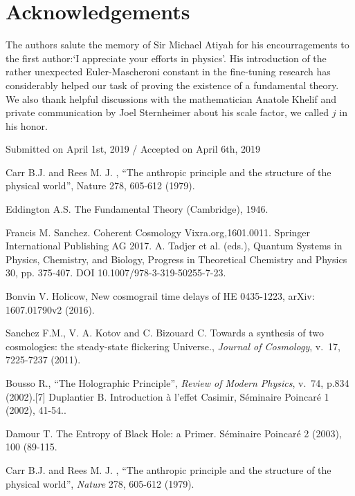 \documentclass[twoside,draft]{article}
\begin{document}
\begin{sloppypar}
{\section*{Acknowledgements}
The authors salute the memory of Sir Michael Atiyah for his encourragements to the
first author:`I appreciate your efforts in physics'. His introduction of the rather
unexpected Euler-Mascheroni constant in the fine-tuning research has considerably helped our task
of proving the existence of a fundamental theory. We also thank helpful discussions with the 
mathematician Anatole Khelif and private communication by Joel Sternheimer about his scale factor, 
we called $j$ in his honor.
%
\begin{flushright}\footnotesize
Submitted on April 1st, 2019 / Accepted on April 6th, 2019
\end{flushright}


\begin{thebibliography}{99}\footnotesize



 Carr B.J. and Rees M. J. , “The anthropic principle and the structure of the physical world”,
Nature 278, 605-612 (1979). %

 Eddington A.S. The Fundamental Theory (Cambridge), 1946.

 Francis M. Sanchez. Coherent Cosmology Vixra.org,1601.0011. Springer International Publishing AG
2017. A. Tadjer et al. (eds.), Quantum Systems in Physics, Chemistry, and Biology, Progress in
Theoretical Chemistry and Physics 30, pp. 375-407. DOI 10.1007/978-3-319-50255-7-23. %

 Bonvin V. Holicow, New cosmograil time delays of HE 0435-1223, arXiv: 1607.01790v2
(2016). %

 Sanchez F.M., V. A. Kotov and C. Bizouard C. Towards a synthesis of two cosmologies: the
steady-state flickering Universe., \textit{Journal of Cosmology}, v.\, 17, 7225-7237 (2011). %

 Bousso R., “The Holographic Principle”, \textit{Review of Modern Physics}, v.\, 74, p.834 (2002).[7] Duplantier B. Introduction à l'effet Casimir, Séminaire Poincaré 1 (2002), 41-54.. %

 Damour T. The Entropy of Black Hole: a Primer. Séminaire Poincaré 2 (2003), 100 (89-115. %

 Carr B.J. and Rees M. J. , “The anthropic principle and the structure of the physical world”,
\textit{Nature} 278, 605-612 (1979). %


\end{thebibliography}}
\end{sloppypar}
\end{document}
